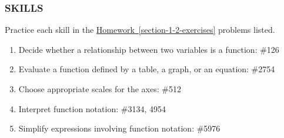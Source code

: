 \documentclass[10pt,]{book}
\theoremstyle{plain}
\theoremstyle{definition}
\theoremstyle{definition}
\theoremstyle{definition}
\theoremstyle{definition}
\numberwithin{equation}{part}
\begin{document}
\subsubsection[{SKILLS}]{SKILLS}\label{subsubsection-8}
Practice each skill in the \hyperref[section-1-2-exercises]{Homework~\ref{section-1-2-exercises}} problems listed. \leavevmode%
\begin{enumerate}[label=\arabic*]
\item\hypertarget{li-335}{}Decide whether a relationship between two variables is a function: \#1\textendash{}26%
\item\hypertarget{li-336}{}Evaluate a function defined by a table, a graph, or an equation: \#27\textendash{}54%
\item\hypertarget{li-337}{}Choose appropriate scales for the axes: \#5\textendash{}12%
\item\hypertarget{li-338}{}Interpret function notation: \#31\textendash{}34, 49\textendash{}54%
\item\hypertarget{li-339}{}Simplify expressions involving function notation: \#59\textendash{}76%
\end{enumerate}
%
\typeout{************************************************}
\typeout{************************************************}
\end{document}
